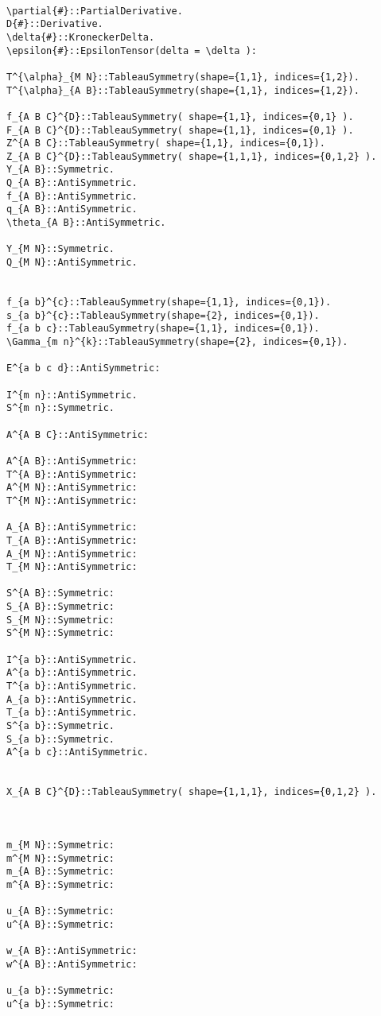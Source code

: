 \documentclass[11pt]{article}
\begin{document}
\\
{\color[named]{Blue}\begin{verbatim}
\partial{#}::PartialDerivative.
D{#}::Derivative.
\delta{#}::KroneckerDelta.
\epsilon{#}::EpsilonTensor(delta = \delta ):

T^{\alpha}_{M N}::TableauSymmetry(shape={1,1}, indices={1,2}).
T^{\alpha}_{A B}::TableauSymmetry(shape={1,1}, indices={1,2}).

f_{A B C}^{D}::TableauSymmetry( shape={1,1}, indices={0,1} ).  
F_{A B C}^{D}::TableauSymmetry( shape={1,1}, indices={0,1} ).  
Z^{A B C}::TableauSymmetry( shape={1,1}, indices={0,1}). 
Z_{A B C}^{D}::TableauSymmetry( shape={1,1,1}, indices={0,1,2} ).  
Y_{A B}::Symmetric.
Q_{A B}::AntiSymmetric.
f_{A B}::AntiSymmetric.
q_{A B}::AntiSymmetric.
\theta_{A B}::AntiSymmetric.

Y_{M N}::Symmetric.
Q_{M N}::AntiSymmetric.


f_{a b}^{c}::TableauSymmetry(shape={1,1}, indices={0,1}).
s_{a b}^{c}::TableauSymmetry(shape={2}, indices={0,1}).
f_{a b c}::TableauSymmetry(shape={1,1}, indices={0,1}).
\Gamma_{m n}^{k}::TableauSymmetry(shape={2}, indices={0,1}).

E^{a b c d}::AntiSymmetric:

I^{m n}::AntiSymmetric.
S^{m n}::Symmetric.

A^{A B C}::AntiSymmetric:

A^{A B}::AntiSymmetric:
T^{A B}::AntiSymmetric:
A^{M N}::AntiSymmetric:
T^{M N}::AntiSymmetric:

A_{A B}::AntiSymmetric:
T_{A B}::AntiSymmetric:
A_{M N}::AntiSymmetric:
T_{M N}::AntiSymmetric:

S^{A B}::Symmetric:
S_{A B}::Symmetric:
S_{M N}::Symmetric:
S^{M N}::Symmetric:

I^{a b}::AntiSymmetric.
A^{a b}::AntiSymmetric.
T^{a b}::AntiSymmetric.
A_{a b}::AntiSymmetric.
T_{a b}::AntiSymmetric.
S^{a b}::Symmetric.
S_{a b}::Symmetric.
A^{a b c}::AntiSymmetric.


X_{A B C}^{D}::TableauSymmetry( shape={1,1,1}, indices={0,1,2} ).  



m_{M N}::Symmetric:
m^{M N}::Symmetric:
m_{A B}::Symmetric:
m^{A B}::Symmetric:

u_{A B}::Symmetric:
u^{A B}::Symmetric:

w_{A B}::AntiSymmetric:
w^{A B}::AntiSymmetric:

u_{a b}::Symmetric:
u^{a b}::Symmetric:


\end{verbatim}}
\end{document}
